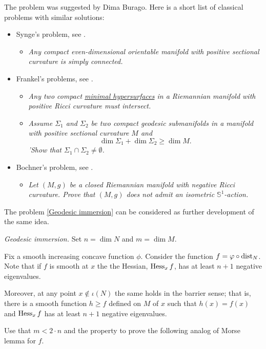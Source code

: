 The problem was suggested by Dima Burago.
Here is a short list of classical problems with similar solutions:
\begin{itemize}
\item Synge's problem, see \cite{synge}.
\begin{itemize}
 \item {\it Any compact even-dimensional orientable manifold with positive sectional curvature is
simply connected.}
\end{itemize}
\item Frankel's problems, see \cite{frankel}.
\begin{itemize}
\item {\it Any two compact \hyperref[Minimal surface]{\emph{minimal hypersurfaces}} in a Riemannian manifold with positive Ricci curvature must intersect.}
\item {\it Assume $\Sigma_1$ and $\Sigma_2$ be two compact geodesic submanifolds in a manifold with positive sectional curvature $M$ and \[\dim \Sigma_1+\dim \Sigma_2\ge \dim M.\] 'Show that $\Sigma_1\cap\Sigma_2\ne\emptyset$.}
\end{itemize}
\item Bochner's problem, see \cite{bochner}.
\begin{itemize}
\item{\it  Let $(M,g)$ be a closed Riemannian manifold with negative Ricci curvature.
Prove that $(M,g)$ does not admit an isometric $\mathbb{S}^1$-action.}
\end{itemize}
\end{itemize}
The problem \ref{Geodesic immersion} can be considered as further development of the same idea.




\textit{Geodesic immersion.}
Set $n=\dim N$ and $m=\dim M$.

Fix a smooth increasing concave function $\phi$.
Consider the function $f=\varphi\circ\operatorname{\rm dist}_N$.
Note that if $f$ is smooth at $x$ 
the the Hessian, $\operatorname{\rm Hess}\nolimits_xf$, has at least $n+1$ negative eigenvalues.

Moreover, at any point $x\notin \iota(N)$ the same holds in the barrier sense;
that is, there is a smooth function $h\ge f$ defined on $M$ of $x$
such that $h(x)=f(x)$ and $\operatorname{\rm Hess}\nolimits_xf$ has at least $n+1$ negative eigenvalues.

Use that $m< 2\cdot n$ and the property to prove the following
analog of Morse lemma for $f$.

